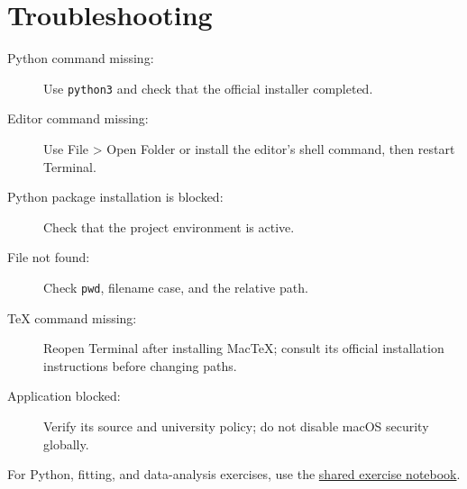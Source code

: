 \documentclass[11pt]{article}
\begin{document}
\section{Troubleshooting}
\begin{description}
\item[Python command missing:] Use \texttt{python3} and check that the
official installer completed.
\item[Editor command missing:] Use File > Open Folder or install the
editor's shell command, then restart Terminal.
\item[Python package installation is blocked:] Check that the project
environment is active.
\item[File not found:] Check \texttt{pwd}, filename case, and the relative path.
\item[TeX command missing:] Reopen Terminal after installing MacTeX; consult
its official installation instructions before changing paths.
\item[Application blocked:] Verify its source and university policy; do not
disable macOS security globally.
\end{description}

\noindent For Python, fitting, and data-analysis exercises, use the
\href{../Example_Code/Exersize.ipynb}{shared exercise notebook}.
\end{document}
